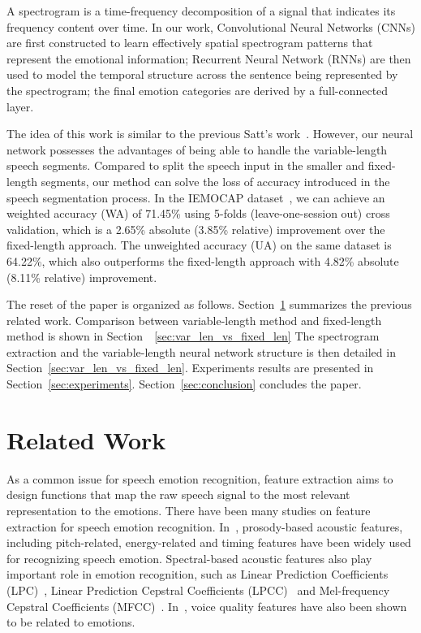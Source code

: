 \documentclass[a4paper]{article}
\begin{document}
A spectrogram is a time-frequency decomposition of a signal that indicates its frequency content over time. In our work, Convolutional Neural Networks (CNNs) are first constructed to learn effectively spatial spectrogram patterns that represent the emotional information; Recurrent Neural Network (RNNs) are then used to model the temporal structure across the sentence being represented by the spectrogram; the final emotion categories are derived by a full-connected layer.

The idea of this work is similar to the previous Satt's work~\cite{satt2017}. However, our neural network possesses the advantages of being able to handle the variable-length speech segments. Compared to split the speech input in the smaller and fixed-length segments, our method can solve the loss of accuracy introduced in the speech segmentation process. In the IEMOCAP dataset~\cite{busso2008}, we can achieve an weighted accuracy (WA) of 71.45\% using 5-folds (leave-one-session out) cross validation, which is a 2.65\% absolute (3.85\% relative) improvement over the fixed-length approach. The unweighted accuracy (UA) on the same dataset is 64.22\%, which also outperforms the fixed-length approach with 4.82\% absolute (8.11\% relative) improvement.

The reset of the paper is organized as follows. Section~\ref{sec:related_work} summarizes the previous related work. Comparison between variable-length method and fixed-length method is shown in Section~~\ref{sec:var_len_vs_fixed_len} The spectrogram extraction and the variable-length neural network structure is then detailed in Section~\ref{sec:var_len_vs_fixed_len}. Experiments results are presented in Section~\ref{sec:experiments}. Section~\ref{sec:conclusion} concludes the paper.

\section{Related Work}
\label{sec:related_work}

As a common issue for speech emotion recognition, feature extraction aims to design functions that map the raw speech signal to the most relevant representation to the emotions. There have been many studies on feature extraction for speech emotion recognition. In~\cite{ma2017, busso2009, cowie2001, vayrynen2013}, prosody-based acoustic features, including pitch-related, energy-related and timing features have been widely used for recognizing speech emotion. Spectral-based acoustic features also play important role in emotion recognition, such as Linear Prediction Coefficients (LPC)~\cite{bellanger1978}, Linear Prediction Cepstral Coefficients (LPCC)~\cite{atal1974} and Mel-frequency Cepstral Coefficients (MFCC)~\cite{davis1980}. In~\cite{gobl2003}, voice quality features have also been shown to be related to emotions.
\end{document}
